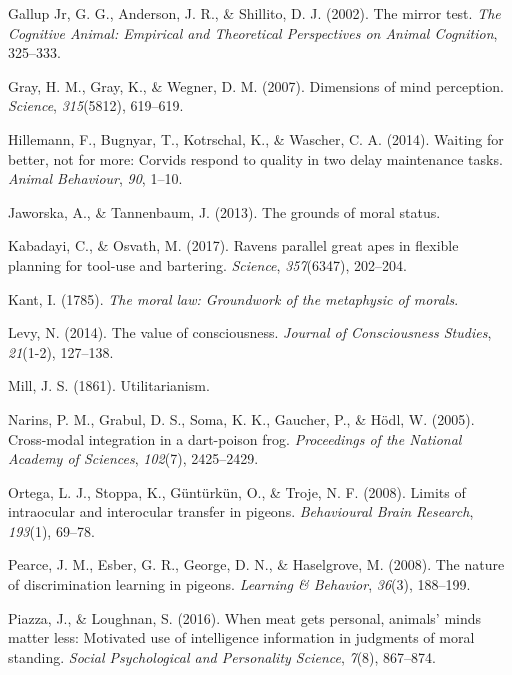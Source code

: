 \documentclass[10pt, letterpaper]{article}
\begin{document}
\leavevmode\hypertarget{ref-gallup2002mirror}{}%
Gallup Jr, G. G., Anderson, J. R., \& Shillito, D. J. (2002). The mirror
test. \emph{The Cognitive Animal: Empirical and Theoretical Perspectives
on Animal Cognition}, 325--333.

\leavevmode\hypertarget{ref-gray2007dimensions}{}%
Gray, H. M., Gray, K., \& Wegner, D. M. (2007). Dimensions of mind
perception. \emph{Science}, \emph{315}(5812), 619--619.

\leavevmode\hypertarget{ref-hillemann2014waiting}{}%
Hillemann, F., Bugnyar, T., Kotrschal, K., \& Wascher, C. A. (2014).
Waiting for better, not for more: Corvids respond to quality in two
delay maintenance tasks. \emph{Animal Behaviour}, \emph{90}, 1--10.

\leavevmode\hypertarget{ref-jaworska2013grounds}{}%
Jaworska, A., \& Tannenbaum, J. (2013). The grounds of moral status.

\leavevmode\hypertarget{ref-kabadayi2017ravens}{}%
Kabadayi, C., \& Osvath, M. (2017). Ravens parallel great apes in
flexible planning for tool-use and bartering. \emph{Science},
\emph{357}(6347), 202--204.

\leavevmode\hypertarget{ref-kant1785moral}{}%
Kant, I. (1785). \emph{The moral law: Groundwork of the metaphysic of
morals}.

\leavevmode\hypertarget{ref-levy2014value}{}%
Levy, N. (2014). The value of consciousness. \emph{Journal of
Consciousness Studies}, \emph{21}(1-2), 127--138.

\leavevmode\hypertarget{ref-mill1861utilitarianism}{}%
Mill, J. S. (1861). Utilitarianism.

\leavevmode\hypertarget{ref-narins2005cross}{}%
Narins, P. M., Grabul, D. S., Soma, K. K., Gaucher, P., \& Hödl, W.
(2005). Cross-modal integration in a dart-poison frog. \emph{Proceedings
of the National Academy of Sciences}, \emph{102}(7), 2425--2429.

\leavevmode\hypertarget{ref-ortega2008limits}{}%
Ortega, L. J., Stoppa, K., Güntürkün, O., \& Troje, N. F. (2008). Limits
of intraocular and interocular transfer in pigeons. \emph{Behavioural
Brain Research}, \emph{193}(1), 69--78.

\leavevmode\hypertarget{ref-pearce2008nature}{}%
Pearce, J. M., Esber, G. R., George, D. N., \& Haselgrove, M. (2008).
The nature of discrimination learning in pigeons. \emph{Learning \&
Behavior}, \emph{36}(3), 188--199.

\leavevmode\hypertarget{ref-piazza2016meat}{}%
Piazza, J., \& Loughnan, S. (2016). When meat gets personal, animals'
minds matter less: Motivated use of intelligence information in
judgments of moral standing. \emph{Social Psychological and Personality
Science}, \emph{7}(8), 867--874.
\end{document}
